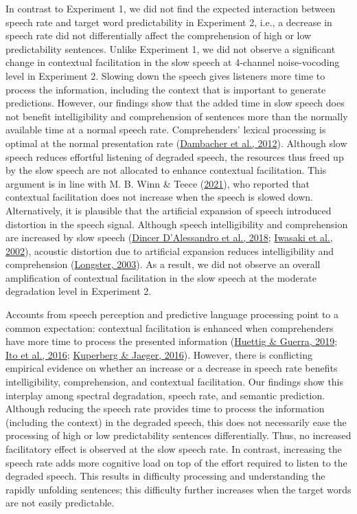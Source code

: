 \documentclass[a4paper, nobind]{templates/ociamthesis}
\begin{document}
In contrast to Experiment 1, we did not find the expected interaction between speech rate and target word predictability in Experiment 2,
i.e., a decrease in speech rate did not differentially affect the comprehension of high or low predictability sentences.
Unlike Experiment 1, we did not observe a significant change in contextual facilitation in the slow speech at 4-channel noise-vocoding level in Experiment 2.
Slowing down the speech gives listeners more time to process the information, including the context that is important to generate predictions.
However, our findings show that the added time in slow speech does not benefit intelligibility and comprehension of sentences more than the normally available time at a normal speech rate.
Comprehenders' lexical processing is optimal at the normal presentation rate (\protect\hyperlink{ref-Dambacher2012}{Dambacher et al., 2012}).
Although slow speech reduces effortful listening of degraded speech, the resources thus freed up by the slow speech are not allocated to enhance contextual facilitation.
This argument is in line with M. B. Winn \& Teece (\protect\hyperlink{ref-Winn2021}{2021}), who reported that contextual facilitation does not increase when the speech is slowed down.
Alternatively, it is plausible that the artificial expansion of speech introduced distortion in the speech signal.
Although speech intelligibility and comprehension are increased by slow speech (\protect\hyperlink{ref-Dincer2018}{Dincer D'Alessandro et al., 2018}; \protect\hyperlink{ref-Iwasaki2002}{Iwasaki et al., 2002}), acoustic distortion due to artificial expansion reduces intelligibility and comprehension (\protect\hyperlink{ref-Longster2003}{Longster, 2003}).
As a result, we did not observe an overall amplification of contextual facilitation in the slow speech at the moderate degradation level in Experiment 2.

Accounts from speech perception and predictive language processing point to a common expectation: contextual facilitation is enhanced when comprehenders have more time to process the presented information (\protect\hyperlink{ref-Huettig2019}{Huettig \& Guerra, 2019}; \protect\hyperlink{ref-Ito2016}{Ito et al., 2016}; \protect\hyperlink{ref-Kuperberg2016}{Kuperberg \& Jaeger, 2016}).
However, there is conflicting empirical evidence on whether an increase or a decrease in speech rate benefits intelligibility, comprehension, and contextual facilitation.
Our findings show this interplay among spectral degradation, speech rate, and semantic prediction.
Although reducing the speech rate provides time to process the information (including the context) in the degraded speech, this does not necessarily ease the processing of high or low predictability sentences differentially.
Thus, no increased facilitatory effect is observed at the slow speech rate.
In contrast, increasing the speech rate adds more cognitive load on top of the effort required to listen to the degraded speech.
This results in difficulty processing and understanding the rapidly unfolding sentences; this difficulty further increases when the target words are not easily predictable.
\end{document}
